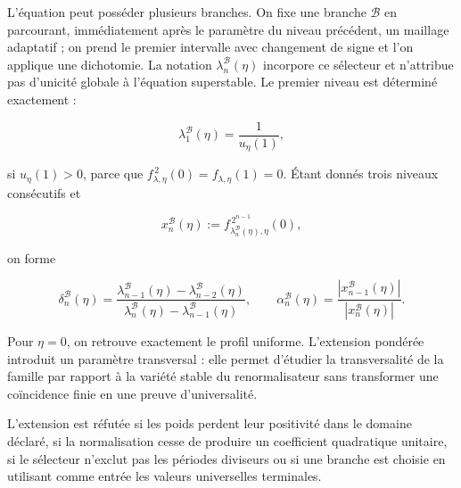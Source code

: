 L’équation peut posséder plusieurs branches. On fixe une branche
\(\mathscr B\) en parcourant, immédiatement après le paramètre du
niveau précédent, un maillage adaptatif ; on prend le premier intervalle avec changement
de signe et l’on applique une dichotomie. La notation
\(\lambda_n^{\mathscr B}(\eta)\) incorpore ce sélecteur et n’attribue pas
d’unicité globale à l’équation superstable. Le premier niveau est déterminé
exactement :

\[
 \lambda_1^{\mathscr B}(\eta)=\frac1{u_\eta(1)},
\]

si \(u_\eta(1)>0\), parce que
\(f_{\lambda,\eta}^{\,2}(0)=f_{\lambda,\eta}(1)=0\).
Étant donnés trois niveaux consécutifs et

\[
 x_n^{\mathscr B}(\eta)
 :=f_{\lambda_n^{\mathscr B}(\eta),\eta}^{\,2^{n-1}}(0),
\]

on forme

\begin{equation}
 \delta_n^{\mathscr B}(\eta)
 =\frac{\lambda_{n-1}^{\mathscr B}(\eta)-
         \lambda_{n-2}^{\mathscr B}(\eta)}
        {\lambda_n^{\mathscr B}(\eta)-
         \lambda_{n-1}^{\mathscr B}(\eta)},
 \qquad
 \alpha_n^{\mathscr B}(\eta)
 =\frac{|x_{n-1}^{\mathscr B}(\eta)|}
        {|x_n^{\mathscr B}(\eta)|}.
 \label{mab:eq:aproximantes-ponderados-armonizados}
\end{equation}

Pour \(\eta=0\), on retrouve exactement le profil uniforme. L’extension
pondérée introduit un paramètre transversal : elle permet d’étudier
la transversalité de la famille par rapport à la variété stable du
renormalisateur sans transformer une coïncidence finie en une preuve
d’universalité.

\begin{remark}
L’extension est réfutée si les poids perdent leur positivité dans le domaine
déclaré, si la normalisation cesse de produire un coefficient quadratique
unitaire, si le sélecteur n’exclut pas les périodes diviseurs ou si une branche est choisie
en utilisant comme entrée les valeurs universelles terminales.
\end{remark}
